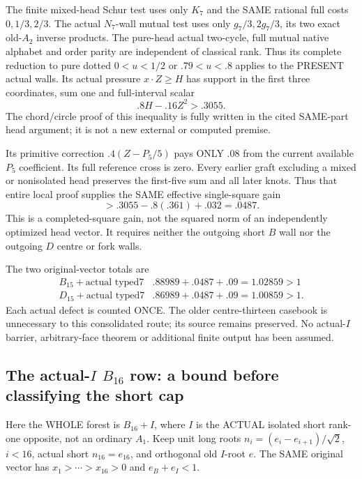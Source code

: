 \documentclass[11pt]{article}
\begin{document}
The finite mixed-head Schur test uses
only \(K_7\) and the SAME rational full
costs \(0,1/3,2/3\).
The actual \(N_7\)-wall mutual test uses
only \(g_7/3,2g_7/3\), its two exact
old-\(A_2\) inverse products.
The pure-head actual two-cycle, full
mutual native alphabet and order parity
are independent of classical rank.
Thus its complete reduction to pure
dotted \(0<u<1/2\) or \(.79<u<.8\)
applies to the PRESENT actual walls.
Its actual pressure \(x\cdot Z\ge H\)
has support in the first three coordinates,
sum one and full-interval scalar
\[
                            .8H-.16Z^2>.3055 .
\]
The chord/circle proof of this inequality
is fully written in the cited SAME-part
head argument; it is not a new external
or computed premise.

Its primitive correction \(.4(Z-P_5/5)\)
pays ONLY \(.08\) from the current available
\(P_5\) coefficient.
Its full reference cross is zero.
Every earlier graft excluding a mixed
or nonisolated head preserves the first-five
sum and all later knots.
Thus that entire local proof supplies the
SAME effective single-square gain
\[
                          >.3055-.8(.361)+.032=.0487 .
\]
This is a completed-square gain, not the
squared norm of an independently optimized
head vector.
It requires neither the outgoing short
\(B\) wall nor the outgoing \(D\) centre
or fork walls.

The two original-vector totals are
\[
 \begin{array}{c|c}
 B_{15}+\text{actual typed7}&.88989+.0487+.09=1.02859>1\\
 D_{15}+\text{actual typed7}&.86989+.0487+.09=1.00859>1 .
 \end{array}
\]
Each actual defect is counted ONCE.
The older centre-thirteen casebook is
unnecessary to this consolidated route;
its source remains preserved.
No actual-\(I\) barrier, arbitrary-face
theorem or additional finite output
has been assumed.

\subsection{The actual-\(I\) \(B_{16}\) row: a bound before classifying the short cap}
\label{app:arithB16Ishort}

Here the WHOLE forest is \(B_{16}+I\),
where \(I\) is the ACTUAL isolated short
rank-one opposite, not an ordinary \(A_1\).
Keep unit long roots
\(n_i=(e_i-e_{i+1})/\sqrt2\), \(i<16\),
actual short \(n_{16}=e_{16}\), and
orthogonal old \(I\)-root \(e\).
The SAME original vector has
\(x_1>\cdots>x_{16}>0\) and
\(e_B+e_I<1\).
\end{document}
